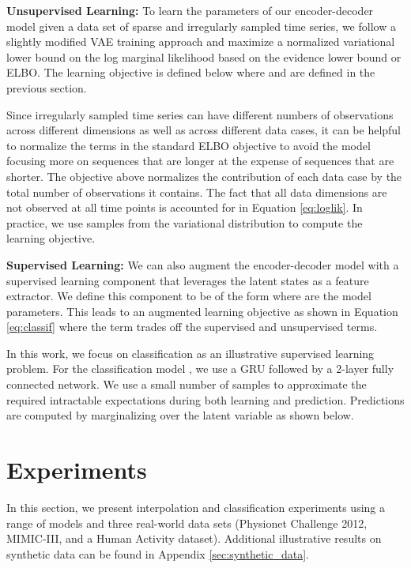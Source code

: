 \documentclass{article} \usepackage{iclr2021_conference,times}
\begin{document}
     



\textbf{Unsupervised Learning:}
To learn the parameters of our encoder-decoder model given a data set of sparse and irregularly sampled time series, we follow a slightly modified VAE training approach and maximize a normalized variational 
lower bound on the log marginal likelihood based on the evidence lower bound or ELBO. The learning objective is defined  below where  and  are defined in the previous section.
\allowdisplaybreaks


Since irregularly sampled time series can have different numbers of observations across different dimensions as well as across different data cases, it can be helpful to normalize the terms in the standard ELBO objective to avoid the model focusing more on sequences that are longer at the expense of sequences that are shorter. The objective above normalizes the contribution of each data case by the total number of observations it contains. The fact that all data dimensions are not observed at all time points is accounted for in Equation \ref{eq:loglik}. In practice, we use  samples from the variational distribution  to compute the learning objective.

\textbf{Supervised Learning:} We can also augment the encoder-decoder model with a supervised learning component that leverages the latent states as a feature extractor. We define this component to be of the form  where  are the model parameters. This leads to an augmented learning objective as shown in Equation \ref{eq:classif} where the  term trades off the supervised and unsupervised terms.

In this work, we focus on classification as an illustrative supervised learning problem. For the classification model , we use a GRU followed by a 2-layer fully connected network. We use a small number of samples to approximate the required intractable expectations during both learning and prediction. Predictions are computed by marginalizing over the latent variable as shown below.

 \vspace{-2em}
\section{Experiments}
In this section, we present interpolation and classification experiments using a range of models and three real-world data sets (Physionet Challenge 2012, MIMIC-III, and a Human Activity dataset). Additional illustrative results on synthetic data can be found in Appendix \ref{sec:synthetic_data}. 
\end{document}
